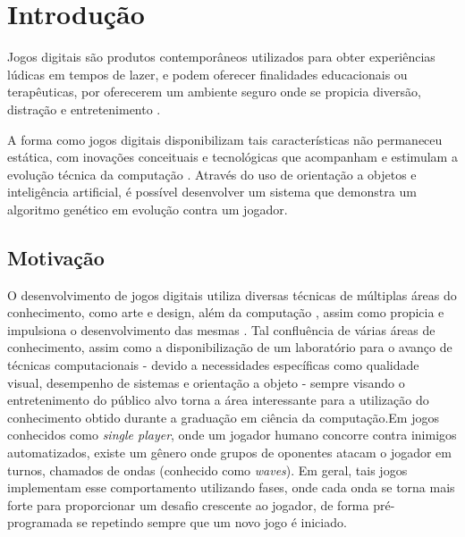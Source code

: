 
\chapter{Introdução}
\label{cap:introducao}

Jogos digitais são produtos contemporâneos utilizados para obter experiências lúdicas em tempos de lazer, e podem oferecer finalidades educacionais ou terapêuticas, por oferecerem um ambiente seguro onde se propicia diversão, distração e entretenimento 
\citep{Kent-2001}.

A forma como jogos digitais disponibilizam tais características não permaneceu estática, com inovações conceituais e tecnológicas que acompanham e estimulam a evolução técnica da computação \citep{Hist_jogos_dig}. Através do uso de orientação a objetos e inteligência artificial, é possível desenvolver um sistema que demonstra um algoritmo genético em evolução contra um jogador.

\section{Motivação}
\label{sec:motivacao}

O desenvolvimento de jogos digitais utiliza diversas técnicas de múltiplas áreas do conhecimento, como arte e design, além da computação \citep{CareerPathsintheGameIndustry}, assim como propicia e impulsiona o desenvolvimento das mesmas \citep{tsang_2021}. Tal confluência de várias áreas de conhecimento, assim como a disponibilização de um laboratório para o avanço de técnicas computacionais - devido a necessidades específicas como qualidade visual, desempenho de sistemas e orientação a objeto - sempre visando o entretenimento do público alvo torna a área interessante para a utilização do conhecimento obtido durante a graduação em ciência da computação.Em jogos conhecidos como \textit{single player}, onde um jogador humano concorre contra inimigos automatizados, existe um gênero onde grupos de oponentes atacam o jogador em turnos, chamados de ondas (conhecido como \textit{waves}). Em geral, tais jogos implementam esse comportamento utilizando fases, onde cada onda se torna mais forte para proporcionar um desafio crescente ao jogador, de forma pré-programada se repetindo sempre que um novo jogo é iniciado. 

